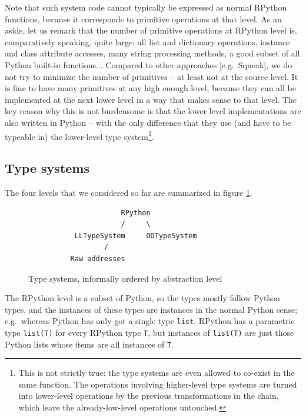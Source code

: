 \documentclass{acm_proc_article-sp}
\begin{document}
Note that such system code cannot typically be expressed as normal
RPython functions, because it corresponds to primitive operations at
that level.  As an aside, let us remark that the number of primitive
operations at RPython level is, comparatively speaking, quite large:
all list and dictionary operations, instance and class attribute
accesses, many string processing methods, a good subset of all Python
built-in functions...  Compared to other approaches [e.g.\ Squeak], we
do not try to minimize the number of primitives -- at least not at the
source level.  It is fine to have many primitives at any high enough
level, because they can all be implemented at the next lower level in
a way that makes sense to that level.  The key reason why this is not
burdensome is that the lower level implementations are also written in
Python -- with the only difference that they use (and have to be
typeable in) the lower-level type system\footnote{This is not strictly
true: the type systems are even allowed to co-exist in the same
function.  The operations involving higher-level type systems are
turned into lower-level operations by the previous transformations in
the chain, which leave the already-low-level operations untouched.}.


\subsection{Type systems}

The four levels that we considered so far are summarized in figure
\ref{fig_typesystems}.

\begin{figure}
\begin{verbatim}
                      RPython
                      /     \
           LLTypeSystem     OOTypeSystem
                  /
          Raw addresses
\end{verbatim}
\caption{Type systems, informally ordered by abstraction level}
\label{fig_typesystems}
\end{figure}

The RPython level is a subset of Python, so the types mostly follow
Python types, and the instances of these types are instances in the
normal Python sense; e.g.\ whereas Python has only got a single type
\texttt{list}, RPython has a parametric type \texttt{list(T)} for every RPython
type \texttt{T}, but instances of \texttt{list(T)} are just those Python lists
whose items are all instances of \texttt{T}.
\end{document}
